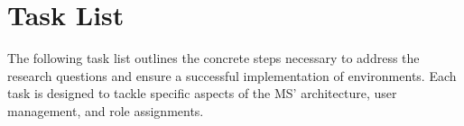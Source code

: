 \begin{enumerate}




\end{enumerate}


\section{Task List}
\label{cha:tasklist}

The following task list outlines the concrete steps necessary to address the research
questions and ensure a successful implementation of environments.
Each task is designed to tackle specific aspects of the MS'
architecture, user management, and role assignments.


